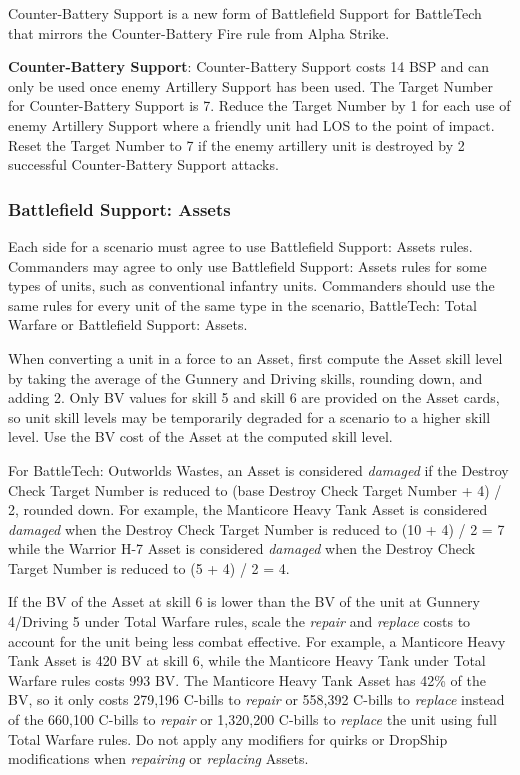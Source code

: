 Counter-Battery Support is a new form of Battlefield Support for BattleTech that mirrors the Counter-Battery Fire rule from Alpha Strike.

{\bfseries Counter-Battery Support}:
Counter-Battery Support costs 14 BSP and can only be used once enemy Artillery Support has been used.
The Target Number for Counter-Battery Support is 7.
Reduce the Target Number by 1 for each use of enemy Artillery Support where a friendly unit had LOS to the point of impact.
Reset the Target Number to 7 if the enemy artillery unit is destroyed by 2 successful Counter-Battery Support attacks.

\subsubsection{Battlefield Support: Assets}

Each side for a scenario must agree to use Battlefield Support: Assets rules.
Commanders may agree to only use Battlefield Support: Assets rules for some types of units, such as conventional infantry units.
Commanders should use the same rules for every unit of the same type in the scenario, BattleTech: Total Warfare or Battlefield Support: Assets.

When converting a unit in a force to an Asset, first compute the Asset skill level by taking the average of the Gunnery and Driving skills, rounding down, and adding 2.
Only BV values for skill 5 and skill 6 are provided on the Asset cards, so unit skill levels may be temporarily degraded for a scenario to a higher skill level.
Use the BV cost of the Asset at the computed skill level.

For BattleTech: Outworlds Wastes, an Asset is considered \emph{damaged} if the Destroy Check Target Number is reduced to (base Destroy Check Target Number + 4) / 2, rounded down.
For example, the Manticore Heavy Tank Asset is considered \emph{damaged} when the Destroy Check Target Number is reduced to (10 + 4) / 2 = 7 while the Warrior H-7 Asset is considered \emph{damaged} when the Destroy Check Target Number is reduced to (5 + 4) / 2 = 4.

If the BV of the Asset at skill 6 is lower than the BV of the unit at Gunnery 4/Driving 5 under Total Warfare rules, scale the \emph{repair} and \emph{replace} costs to account for the unit being less combat effective.
For example, a Manticore Heavy Tank Asset is 420 BV at skill 6, while the Manticore Heavy Tank under Total Warfare rules costs 993 BV.
The Manticore Heavy Tank Asset has 42\% of the BV, so it only costs 279,196 C-bills to \emph{repair} or 558,392 C-bills to \emph{replace} instead of the 660,100 C-bills to \emph{repair} or 1,320,200 C-bills to \emph{replace} the unit using full Total Warfare rules.
Do not apply any modifiers for quirks or DropShip modifications when \emph{repairing} or \emph{replacing} Assets.

